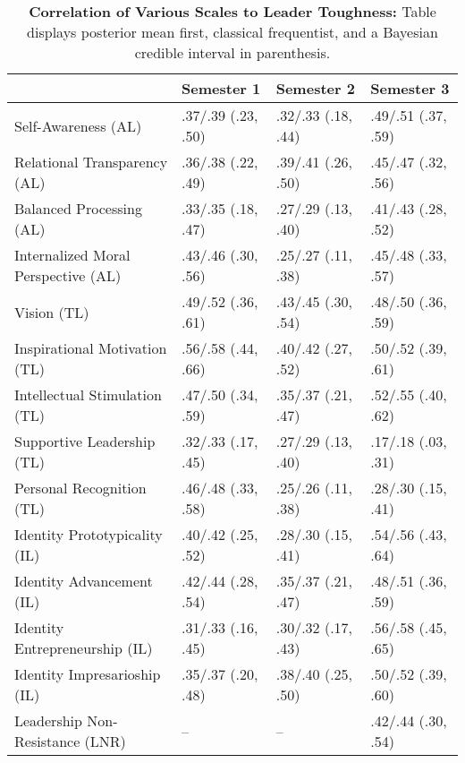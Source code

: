 \begin{table}[ht]
\centering
\begin{tabular}{llll}
  \hline
 & Semester 1 & Semester 2 & Semester 3 \\ 
  \hline
Self-Awareness (AL) & .37/.39 (.23, .50) & .32/.33 (.18, .44) & .49/.51 (.37, .59) \\ 
  Relational Transparency (AL) & .36/.38 (.22, .49) & .39/.41 (.26, .50) & .45/.47 (.32, .56) \\ 
  Balanced Processing (AL) & .33/.35 (.18, .47) & .27/.29 (.13, .40) & .41/.43 (.28, .52) \\ 
  Internalized Moral Perspective (AL) & .43/.46 (.30, .56) & .25/.27 (.11, .38) & .45/.48 (.33, .57) \\ 
  Vision (TL) & .49/.52 (.36, .61) & .43/.45 (.30, .54) & .48/.50 (.36, .59) \\ 
  Inspirational Motivation (TL) & .56/.58 (.44, .66) & .40/.42 (.27, .52) & .50/.52 (.39, .61) \\ 
  Intellectual Stimulation (TL) & .47/.50 (.34, .59) & .35/.37 (.21, .47) & .52/.55 (.40, .62) \\ 
  Supportive Leadership (TL) & .32/.33 (.17, .45) & .27/.29 (.13, .40) & .17/.18 (.03, .31) \\ 
  Personal Recognition (TL) & .46/.48 (.33, .58) & .25/.26 (.11, .38) & .28/.30 (.15, .41) \\ 
  Identity Prototypicality (IL) & .40/.42 (.25, .52) & .28/.30 (.15, .41) & .54/.56 (.43, .64) \\ 
  Identity Advancement (IL) & .42/.44 (.28, .54) & .35/.37 (.21, .47) & .48/.51 (.36, .59) \\ 
  Identity Entrepreneurship (IL) & .31/.33 (.16, .45) & .30/.32 (.17, .43) & .56/.58 (.45, .65) \\ 
  Identity Impresarioship (IL) & .35/.37 (.20, .48) & .38/.40 (.25, .50) & .50/.52 (.39, .60) \\ 
  Leadership Non-Resistance (LNR) & -- & -- & .42/.44 (.30, .54) \\ 
   \hline
\end{tabular}
\caption{\textbf{Correlation of Various Scales to Leader Toughness:} Table displays posterior mean first, classical frequentist, and a Bayesian credible interval in parenthesis.} 
\label{tab:lead_corr}
\end{table}

